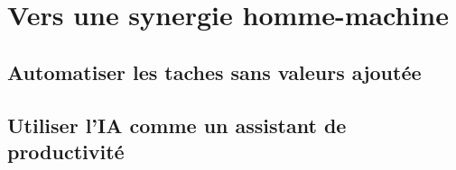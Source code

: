 \part{Vers une synergie homme-machine}
\chapter{Automatiser les taches sans valeurs ajoutée}
\chapter{Utiliser l'IA comme un assistant de productivité}
